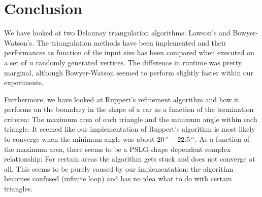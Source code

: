 \section{Conclusion}
\label{sec:conclusion}

We have looked at two Delaunay triangulation algorithms: Lawson's and Bowyer-Watson's.
The triangulation methods have been implemented and their performances as function of the input size has been compared
when executed on a set of $n$ randomly generated vertices.
The difference in runtime was pretty marginal, although Bowyer-Watson seemed to perform slightly faster within our experiments.

Furthermore, we have looked at Ruppert's refinement algorithm and how it performs on the boundary in the shape of a car
as a function of the termination criterea: The maximum area of each triangle and the minimum angle within each triangle.
It seemed like our implementation of Ruppert's algorithm is most likely to converge when the minimum angle was about $20\,^{\circ} - 22.5\,^{\circ}$.
As a function of the maximum area, there seems to be a PSLG-shape dependent complex relationship:
For certain areas the algorithm gets stuck and does not converge at all.
This seems to be purely caused by our implementation: the algorithm becomes confused (infinite loop) and has no idea what to do with certain triangles.

